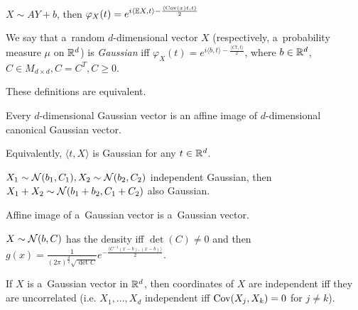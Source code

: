 	\begin{remark}
		$X \sim AY + b$, then $\displaystyle \varphi_X(t) = e^{i \langle \mathbb{E} X, t \rangle - \frac{\langle \mathrm{Cov}(x)t, t \rangle}{2}}$
	\end{remark}
	
	\begin{definition}
		We say that a~random $d$-dimensional vector $X$ (respectively, a~probability measure $\mu$ on $\mathbb{R}^d$) is \emph{Gaussian} iff $\displaystyle \varphi_X(t) = e^{i \langle b,t \rangle - \frac{ \langle Ct, t\rangle }{2}}$, where $b \in \mathbb{R}^d$, $C \in M_{d \times d}, C = C^T, C \geq 0$.
	\end{definition}
	
	\begin{proposition}
		These definitions are equivalent.
	\end{proposition}
	
	\begin{corollary}
		Every $d$-dimensional Gaussian vector is an affine image of $d$-dimensional canonical Gaussian vector.
	\end{corollary}
	
	\begin{remark}
		Equivalently, $\langle t, X\rangle$ is Gaussian for any $t \in \mathbb{R}^d$.
	\end{remark}
	
	\begin{corollary}
		$X_1 \sim \mathcal{N}(b_1, C_1), X_2 \sim \mathcal{N}(b_2, C_2)$ independent Gaussian, then $X_1+X_2 \sim \mathcal{N}(b_1 + b_2, C_1 + C_2)$ also Gaussian.
	\end{corollary}
	
	\begin{corollary}
		Affine image of a~Gaussian vector is a~Gaussian vector.
	\end{corollary}
	
	\begin{remark}
		$X \sim \mathcal{N}(b, C)$ has the density iff $\det(C) \neq 0$ and then $\displaystyle g(x) = \frac{1}{(2 \pi)^{\frac{d}{2}} \sqrt{\det C}} e^{-\frac{\langle C^{-1} (x-b), (x-b)\rangle}{2}}.$
	\end{remark}
	
	\begin{theorem}
		If $X$ is a~Gaussian vector in $\mathbb{R}^d$, then coordinates of $X$ are independent iff they are uncorrelated (i.e. $X_1, \ldots, X_d$ independent iff $\mathrm{Cov}(X_j, X_k) = 0 $ for $j\neq k$).
	\end{theorem}
	
